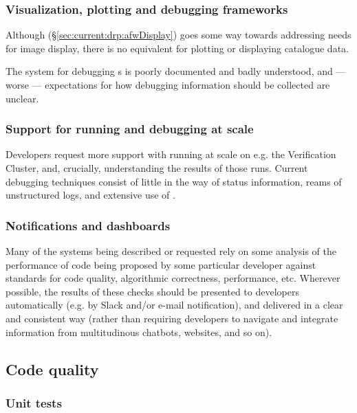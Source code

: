 \documentclass[DM,authoryear,toc,lsstdraft]{lsstdoc}
\begin{document}
\subsubsection{Visualization, plotting and debugging frameworks}

Although  (\S\ref{sec:current:drp:afwDisplay}) goes some way
towards addressing needs for image display, there is no equivalent for
plotting or displaying catalogue data.

The  system for debugging s is poorly documented
and badly understood, and --- worse --- expectations for how debugging
information should be collected are unclear.

\subsubsection{Support for running and debugging at scale}

Developers request more support with running at scale on e.g. the Verification
Cluster, and, crucially, understanding the results of those runs. Current
debugging techniques consist of little in the way of status information, reams
of unstructured logs, and extensive use of .

\subsubsection{Notifications and dashboards}
\label{sec:requests:notifications}

Many of the systems being described or requested rely on some analysis of the
performance of code being proposed by some particular developer against
standards for code quality, algorithmic correctness, performance, etc.
Wherever possible, the results of these checks should be presented to
developers automatically (e.g. by Slack and/or e-mail notification), and
delivered in a clear and consistent way (rather than requiring developers to
navigate and integrate information from multitudinous chatbots, websites,
and so on).

\subsection{Code quality}

\subsubsection{Unit tests}
\end{document}
